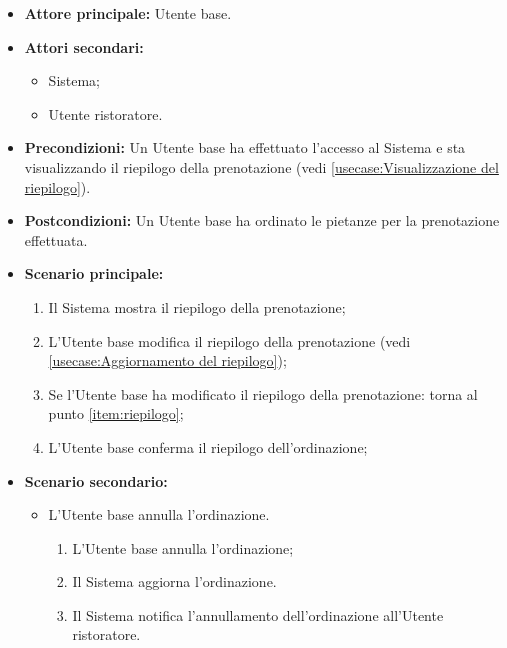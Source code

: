 \label{usecase:Ordinazione collaborativa dei pasti}
\begin{itemize}
	\item \textbf{Attore principale:} Utente base.

	\item \textbf{Attori secondari:}
	      \begin{itemize}
		      \item Sistema;
		      \item Utente ristoratore.
	      \end{itemize}

	\item \textbf{Precondizioni:}
	      Un Utente base ha effettuato l'accesso al Sistema e sta
	      visualizzando il riepilogo della prenotazione (vedi \autoref{usecase:Visualizzazione del riepilogo}).

	\item \textbf{Postcondizioni:}
	      Un Utente base ha ordinato le pietanze per la prenotazione effettuata.

	\item \textbf{Scenario principale:}
	      \begin{enumerate}
		      \item \label{item:riepilogo}
		            Il Sistema mostra il riepilogo della prenotazione;

		      \item L'Utente base modifica il riepilogo della prenotazione
		            (vedi \autoref{usecase:Aggiornamento del riepilogo});

		      \item Se l'Utente base ha modificato il riepilogo della
		            prenotazione: torna al punto \ref{item:riepilogo};

		      \item L'Utente base conferma il riepilogo dell'ordinazione;
	      \end{enumerate}

	\item \textbf{Scenario secondario:}
	      \begin{itemize}
		      \item L'Utente base annulla l'ordinazione.
		            \begin{enumerate}
			            \item L'Utente base annulla l'ordinazione;
			            \item Il Sistema aggiorna l'ordinazione.
			            \item Il Sistema notifica l'annullamento dell'ordinazione
			                  all'Utente ristoratore.
		            \end{enumerate}


\end{itemize}
\end{itemize}
